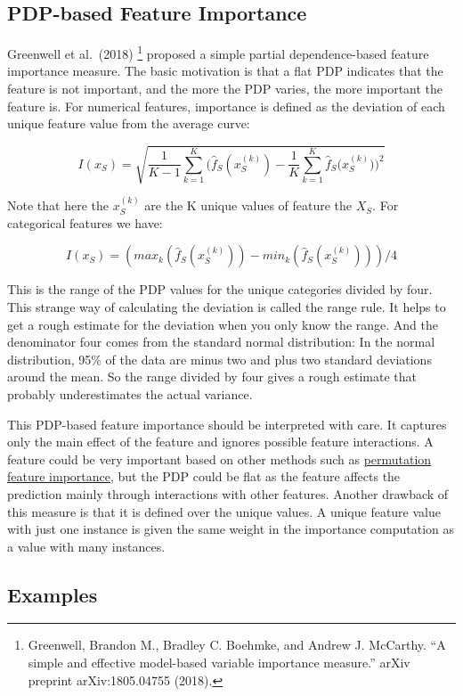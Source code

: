 \documentclass[
  11pt,
]{scrbook}
\begin{document}
\hypertarget{pdp-based-feature-importance}{%
\subsection{PDP-based Feature Importance}\label{pdp-based-feature-importance}}

Greenwell et al.~(2018) \footnote{Greenwell, Brandon M., Bradley C. Boehmke, and Andrew J. McCarthy. ``A simple and effective model-based variable importance measure.'' arXiv preprint arXiv:1805.04755 (2018).} proposed a simple partial dependence-based feature importance measure.
The basic motivation is that a flat PDP indicates that the feature is not important, and the more the PDP varies, the more important the feature is.
For numerical features, importance is defined as the deviation of each unique feature value from the average curve:

\[I(x_S) =  \sqrt{\frac{1}{K-1}\sum_{k=1}^K(\hat{f}_S(x^{(k)}_S) - \frac{1}{K}\sum_{k=1}^K \hat{f}_S({x^{(k)}_S))^2}}\]

Note that here the \(x^{(k)}_S\) are the K unique values of feature the \(X_S\).
For categorical features we have:

\[I(x_S) = (max_k(\hat{f}_S(x^{(k)}_S)) - min_k(\hat{f}_S(x^{(k)}_S)))/4\]

This is the range of the PDP values for the unique categories divided by four.
This strange way of calculating the deviation is called the range rule.
It helps to get a rough estimate for the deviation when you only know the range.
And the denominator four comes from the standard normal distribution:
In the normal distribution, 95\% of the data are minus two and plus two standard deviations around the mean.
So the range divided by four gives a rough estimate that probably underestimates the actual variance.

This PDP-based feature importance should be interpreted with care.
It captures only the main effect of the feature and ignores possible feature interactions.
A feature could be very important based on other methods such as \protect\hyperlink{feature-importance}{permutation feature importance}, but the PDP could be flat as the feature affects the prediction mainly through interactions with other features.
Another drawback of this measure is that it is defined over the unique values.
A unique feature value with just one instance is given the same weight in the importance computation as a value with many instances.

\hypertarget{examples}{%
\subsection{Examples}\label{examples}}
\end{document}

